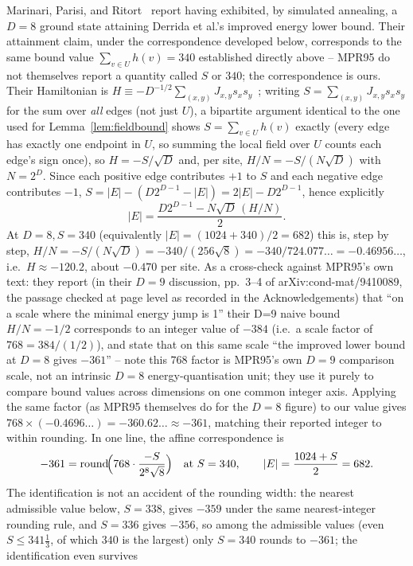 \documentclass[12pt]{article}
\begin{document}
Marinari, Parisi, and Ritort~\cite{MPR95} report having exhibited, by
simulated annealing, a $D=8$ ground state attaining Derrida et
al.'s improved energy lower bound. Their attainment claim, under the
correspondence developed below, corresponds to the same bound value
$\sum_{v\in U}h(v)=340$ established directly above -- MPR95 do not
themselves report a quantity called $S$ or $340$; the correspondence is
ours. Their Hamiltonian is
$H\equiv-D^{-1/2}\sum_{(x,y)}J_{x,y}s_xs_y$~\cite[Eq.~3]{MPR95}; writing
$S=\sum_{(x,y)}J_{x,y}s_xs_y$ for the sum over \emph{all} edges (not
just $U$), a bipartite argument identical to the one used for
Lemma~\ref{lem:fieldbound} shows $S=\sum_{v\in U}h(v)$ exactly (every
edge has exactly one endpoint in $U$, so summing the local field over
$U$ counts each edge's sign once), so $H=-S/\sqrt D$ and, per site,
$H/N=-S/(N\sqrt D)$ with $N=2^D$. Since each positive edge contributes
$+1$ to $S$ and each negative edge contributes $-1$,
$S=|E|-(D2^{D-1}-|E|)=2|E|-D2^{D-1}$, hence explicitly
\[
  |E|=\frac{D2^{D-1}-N\sqrt D\,(H/N)}{2}.
\]
At $D=8,S=340$ (equivalently $|E|=(1024+340)/2=682$) this is, step by
step, $H/N=-S/(N\sqrt D)=-340/(256\sqrt8)=-340/724.077\ldots
=-0.46956\ldots$, i.e.\ $H\approx-120.2$, about $-0.470$ per site. As a cross-check
against MPR95's own text: they report (in their $D{=}9$ discussion, pp.~3--4 of
arXiv:cond-mat/9410089, the passage checked at page level as recorded in
the Acknowledgements) that
``on a scale where the minimal energy jump is 1'' their D=9 naive
bound $H/N=-1/2$ corresponds to an integer value of $-384$ (i.e.\ a
scale factor of $768=384/(1/2)$), and state that on this same scale
``the improved lower bound at $D=8$ gives $-361$'' -- note this $768$
factor is MPR95's own $D{=}9$ comparison scale, not an intrinsic
$D{=}8$ energy-quantisation unit; they use it purely to compare bound
values across dimensions on one common integer axis. Applying the same
factor (as MPR95 themselves do for the $D=8$ figure) to our value gives $768\times(-0.4696\ldots)=-360.62\ldots
\approx-361$, matching their reported integer to within rounding. In one
line, the affine correspondence is
\[
-361=\operatorname{round}\!\Bigl(768\cdot\frac{-S}{2^{8}\sqrt8}\Bigr)
\quad\text{at }S=340,
\qquad
|E|=\frac{1024+S}{2}=682 .
\] The
identification is not an accident of the rounding width: the nearest
admissible value below, $S=338$, gives $-359$ under the same
nearest-integer rounding rule, and $S=336$ gives $-356$, so among the
admissible values (even $S\le341\tfrac13$, of which $340$ is the
largest) only $S=340$ rounds to $-361$; the identification even survives
\end{document}

